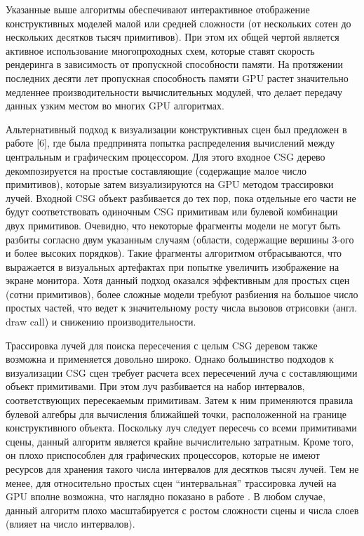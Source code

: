 Указанные выше алгоритмы обеспечивают интерактивное отображение конструктивных моделей малой или средней  сложности (от нескольких сотен до нескольких десятков тысяч примитивов). При этом их общей чертой является активное использование многопроходных схем, которые ставят скорость рендеринга в зависимость от пропускной способности памяти. На протяжении последних десяти лет пропускная способность памяти GPU растет значительно медленнее производительности вычислительных модулей,  что делает передачу данных узким местом во многих GPU алгоритмах.

Альтернативный подход к визуализации конструктивных сцен был предложен в работе [6], где была предпринята попытка распределения вычислений между центральным и графическим процессором. Для этого входное CSG дерево декомпозируется на простые составляющие (содержащие малое число примитивов), которые затем визуализируются на GPU методом трассировки лучей. Входной CSG объект разбивается до тех пор, пока отдельные его части не будут соответствовать одиночным CSG примитивам или булевой  комбинации двух примитивов. Очевидно, что некоторые фрагменты модели не могут быть разбиты согласно двум указанным случаям (области, содержащие вершины 3-ого и более высоких порядков). Такие фрагменты алгоритмом отбрасываются, что выражается в визуальных артефактах при попытке увеличить изображение на экране монитора. Хотя данный подход оказался эффективным для простых сцен (сотни примитивов), более сложные модели требуют разбиения на большое число простых частей, что ведет к значительному росту числа вызовов отрисовки (англ. draw call) и снижению производительности.

Трассировка лучей для поиска пересечения с целым CSG деревом также возможна и применяется довольно широко. Однако большинство подходов к визуализации CSG сцен требует расчета всех пересечений луча с составляющими объект примитивами. При этом луч разбивается на набор интервалов, соответствующих пересекаемым примитивам. Затем к ним применяются правила булевой алгебры для вычисления ближайшей точки, расположенной на границе конструктивного объекта. Поскольку луч следует пересечь со всеми примитивами сцены, данный алгоритм является крайне вычислительно затратным. Кроме того, он плохо приспособлен для графических процессоров, которые не имеют ресурсов для хранения такого числа интервалов для десятков тысяч лучей. Тем не менее, для относительно простых сцен “интервальная” трассировка лучей на GPU вполне возможна, что наглядно показано в работе \todo{[7]}. В любом случае, данный алгоритм плохо масштабируется с ростом сложности сцены и числа слоев (влияет на число интервалов).

